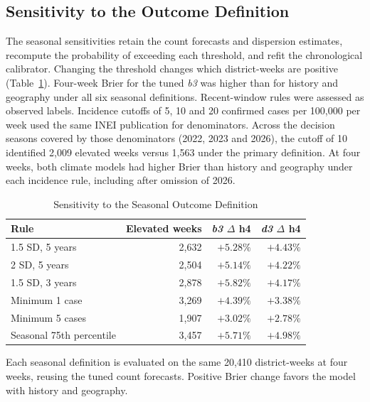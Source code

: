 \documentclass[journal]{IEEEtran}
\newcommand{\bthree}{\textit{b3}}
\newcommand{\dthree}{\textit{d3}}
\begin{document}
\subsection{Sensitivity to the Outcome Definition}
The seasonal sensitivities retain the count forecasts and dispersion estimates, recompute the probability of exceeding each threshold, and refit the chronological calibrator. Changing the threshold changes which district-weeks are positive (Table~\ref{tab:label}). Four-week Brier for the tuned \bthree{} was higher than for history and geography under all six seasonal definitions. Recent-window rules were assessed as observed labels. Incidence cutoffs of 5, 10 and 20 confirmed cases per 100,000 per week used the same INEI publication for denominators. Across the decision seasons covered by those denominators (2022, 2023 and 2026), the cutoff of 10 identified 2,009 elevated weeks versus 1,563 under the primary definition. At four weeks, both climate models had higher Brier than history and geography under each incidence rule, including after omission of 2026.

\begin{table}[!t]
\caption{Sensitivity to the Seasonal Outcome Definition}
\label{tab:label}
\centering
\begin{tabular}{@{}lrrr@{}}
\toprule
Rule & Elevated weeks & \bthree{} $\Delta$ h4 & \dthree{} $\Delta$ h4\\
\midrule
1.5 SD, 5 years & 2,632 & $+5.28\%$ & $+4.43\%$\\
2 SD, 5 years & 2,504 & $+5.14\%$ & $+4.22\%$\\
1.5 SD, 3 years & 2,878 & $+5.82\%$ & $+4.17\%$\\
Minimum 1 case & 3,269 & $+4.39\%$ & $+3.38\%$\\
Minimum 5 cases & 1,907 & $+3.02\%$ & $+2.78\%$\\
Seasonal 75th percentile & 3,457 & $+5.71\%$ & $+4.98\%$\\
\bottomrule
\end{tabular}

\vspace{2pt}\parbox{0.95\columnwidth}{\footnotesize Each seasonal definition is evaluated on the same 20,410 district-weeks at four weeks, reusing the tuned count forecasts. Positive Brier change favors the model with history and geography.}
\end{table}
\end{document}
